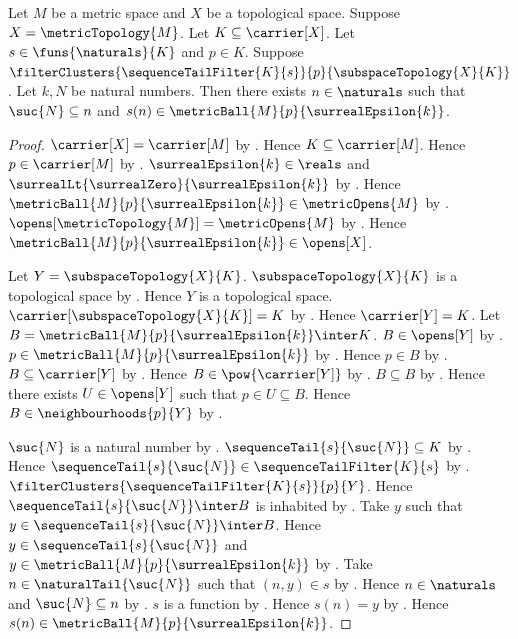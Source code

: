 \begin{lemma}\label{sequence_cluster_has_late_ball_index}
    Let $M$ be a metric space and $X$ be a topological space.
    Suppose $X=\metricTopology{M}$.
    Let $K\subseteq\carrier[X]$.
    Let $s\in\funs{\naturals}{K}$ and $p\in K$.
    Suppose
        $\filterClusters{\sequenceTailFilter{K}{s}}{p}
            {\subspaceTopology{X}{K}}$.
    Let $k,N$ be natural numbers.
    Then there exists $n\in\naturals$ such that
        $\suc{N}\subseteq n$ and
        $s(n)\in\metricBall{M}{p}{\surrealEpsilon{k}}$.
\end{lemma}
\begin{proof}
    $\carrier[X]=\carrier[M]$ by
        .
    Hence $K\subseteq\carrier[M]$.
    Hence $p\in\carrier[M]$ by .
    $\surrealEpsilon{k}\in\reals$ and
        $\surrealLt{\surrealZero}{\surrealEpsilon{k}}$ by
        .
    Hence $\metricBall{M}{p}{\surrealEpsilon{k}}
        \in\metricOpens{M}$ by .
    $\opens[\metricTopology{M}]=\metricOpens{M}$ by
        .
    Hence $\metricBall{M}{p}{\surrealEpsilon{k}}\in\opens[X]$.

    Let $Y=\subspaceTopology{X}{K}$.
    $\subspaceTopology{X}{K}$ is a topological space by
        .
    Hence $Y$ is a topological space.
    $\carrier[\subspaceTopology{X}{K}]=K$ by
        .
    Hence $\carrier[Y]=K$.
    Let $B=\metricBall{M}{p}{\surrealEpsilon{k}}\inter K$.
    $B\in\opens[Y]$ by .
    $p\in\metricBall{M}{p}{\surrealEpsilon{k}}$ by
        .
    Hence $p\in B$ by .
    $B\subseteq\carrier[Y]$ by .
    Hence $B\in\pow{\carrier[Y]}$ by .
    $B\subseteq B$ by .
    Hence there exists $U\in\opens[Y]$ such that
        $p\in U\subseteq B$.
    Hence $B\in\neighbourhoods{p}{Y}$ by .

    $\suc{N}$ is a natural number by .
    $\sequenceTail{s}{\suc{N}}\subseteq K$ by
        .
    Hence $\sequenceTail{s}{\suc{N}}
        \in\sequenceTailFilter{K}{s}$ by
        .
    $\filterClusters{\sequenceTailFilter{K}{s}}{p}{Y}$.
    Hence $\sequenceTail{s}{\suc{N}}\inter B$ is inhabited by
        .
    Take $y$ such that $y\in\sequenceTail{s}{\suc{N}}\inter B$.
    Hence $y\in\sequenceTail{s}{\suc{N}}$ and
        $y\in\metricBall{M}{p}{\surrealEpsilon{k}}$ by
        .
    Take $n\in\naturalTail{\suc{N}}$ such that $(n,y)\in s$ by
        .
    Hence $n\in\naturals$ and $\suc{N}\subseteq n$ by
        .
    $s$ is a function by .
    Hence $s(n)=y$ by .
    Hence $s(n)\in\metricBall{M}{p}{\surrealEpsilon{k}}$.
\end{proof}

